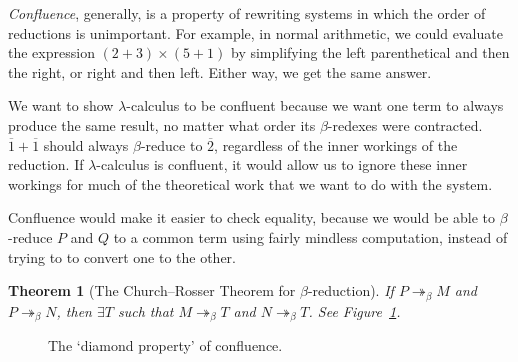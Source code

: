 \documentclass[a4paper, 11pt]{article}
\theoremstyle{plain}
\newtheorem{thm}{Theorem}[section]
\theoremstyle{definition}
\theoremstyle{remark}
\newcommand\bred{\mathrel{\twoheadrightarrow_\beta}}
\begin{document}
\textit{Confluence}, generally, is a property of rewriting systems in which the order of reductions is unimportant. For example, in normal arithmetic, we could evaluate the expression $(2 + 3) \times (5 + 1)$ by simplifying the left parenthetical and then the right, or right and then left. Either way, we get the same answer.

We want to show $\lambda$-calculus to be confluent because we want one term to always produce the same result, no matter what order its $\beta$-redexes were contracted. $\overline 1 + \overline 1$ should always $\beta$-reduce to $\overline 2$, regardless of the inner workings of the reduction. If $\lambda$-calculus is confluent, it would allow us to ignore these inner workings for much of the theoretical work that we want to do with the system.

Confluence would make it easier to check equality, because we would be able to $\beta$-reduce $P$ and $Q$ to a common term using fairly mindless computation, instead of trying to to convert one to the other.

\begin{thm}[The Church--Rosser Theorem for $\beta$-reduction]\label{thm:church-rosser-beta-reduction} %
If $P \bred M$ and $P \bred N$, then $\exists T$ such that $M \bred T$ and $N \bred T$. See Figure~\ref{fig:church-rosser-diamond}.
\end{thm}

\begin{figure}[htbp]
\centering
{}
\caption{The `diamond property' of confluence\protect\footnotemark.}%
\label{fig:church-rosser-diamond}
\end{figure}
\end{document}
